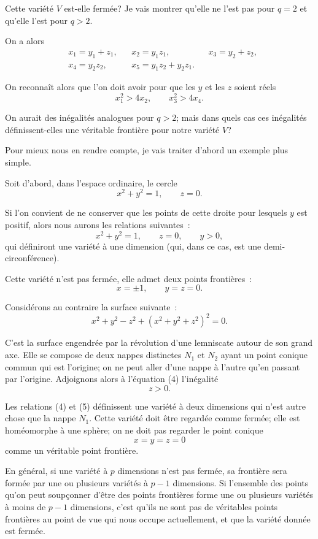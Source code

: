 \documentclass{article}
\begin{document}
Cette variété $V$ est-elle fermée? Je vais montrer qu'elle ne l'est pas pour $q = 2$ et qu'elle l'est pour $q > 2$.

On a alors
\[ \begin{aligned} &x_{1} = y_{1} + z_{1}, &&x_{2} = y_{1}z_{1}, &&x_{3} = y_{2} + z_{2},\\ &x_{4} = y_{2}z_{2}, &&x_{5} = y_{1}z_{2} + y_{2}z_{1}. \end{aligned} \]

On reconnaît alors que l'on doit avoir pour que les $y$ et les $z$ soient réels
\[ x^{2}_{1} > 4x_{2}, \qquad x^{2}_{3} > 4x_{4}. \]

On aurait des inégalités analogues pour $q > 2$; mais dans quels cas ces inégalités définissent-elles une véritable frontière pour notre variété $V$?

Pour mieux nous en rendre compte, je vais traiter d'abord un exemple plus simple.

Soit d'abord, dans l'espace ordinaire, le cercle
\[ x^{2} + y^{2} = 1, \qquad z = 0. \]

Si l'on convient de ne conserver que les points de cette droite pour lesquels $y$ est positif, alors nous aurons les relations suivantes~:
\[ x^{2} + y^{2} = 1, \qquad z = 0, \qquad y > 0, \]
qui définiront une variété à une dimension (qui, dans ce cas, est une demi-circonférence).

Cette variété n'est pas fermée, elle admet deux points frontières~:
\[ x = \pm 1, \qquad y = z = 0. \]

Considérons au contraire la surface suivante~:
\[ x^{2} + y^{2} - z^{2} + (x^{2} + y^{2} + z^{2})^{2} = 0. \tag{4} \]

C'est la surface engendrée par la révolution d'une lemniscate autour de son grand axe. Elle se compose de deux nappes distinctes $N_{1}$ et $N_{2}$ ayant un point conique commun qui est l'origine; on ne peut aller d'une nappe à l'autre qu'en passant par l'origine. Adjoignons alors à l'équation (4) l'inégalité
\[ z > 0. \tag{5} \]

Les relations (4) et (5) définissent une variété à deux dimensions qui n'est autre chose que la nappe $N_{1}$. Cette variété doit être regardée comme fermée; elle est homéomorphe à une sphère; on ne doit pas regarder le point conique
\[ x = y = z = 0 \]
comme un véritable point frontière.

En général, si une variété à $p$ dimensions n'est pas fermée, sa frontière sera formée par une ou plusieurs variétés à $p - 1$ dimensions. Si l'ensemble des points qu'on peut soupçonner d'être des points frontières forme une ou plusieurs variétés à moins de $p - 1$ dimensions, c'est qu'ils ne sont pas de véritables points frontières au point de vue qui nous occupe actuellement, et que la variété donnée est fermée.
\end{document}

